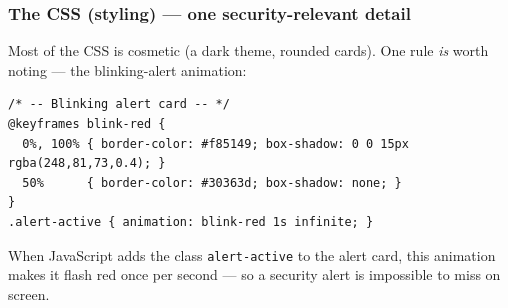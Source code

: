 \documentclass[11pt,a4paper]{article}
\begin{document}
\subsubsection*{The CSS (styling) --- one security-relevant detail}
Most of the CSS is cosmetic (a dark theme, rounded cards). One rule \emph{is}
worth noting --- the blinking-alert animation:
\begin{lstlisting}[style=web,caption={dashboard.html --- the alert-blink CSS (decorative comment dashes simplified).}]
/* -- Blinking alert card -- */
@keyframes blink-red {
  0%, 100% { border-color: #f85149; box-shadow: 0 0 15px rgba(248,81,73,0.4); }
  50%      { border-color: #30363d; box-shadow: none; }
}
.alert-active { animation: blink-red 1s infinite; }
\end{lstlisting}
When JavaScript adds the class \texttt{alert-active} to the alert card, this
animation makes it flash red once per second --- so a security alert is
impossible to miss on screen.
\end{document}
